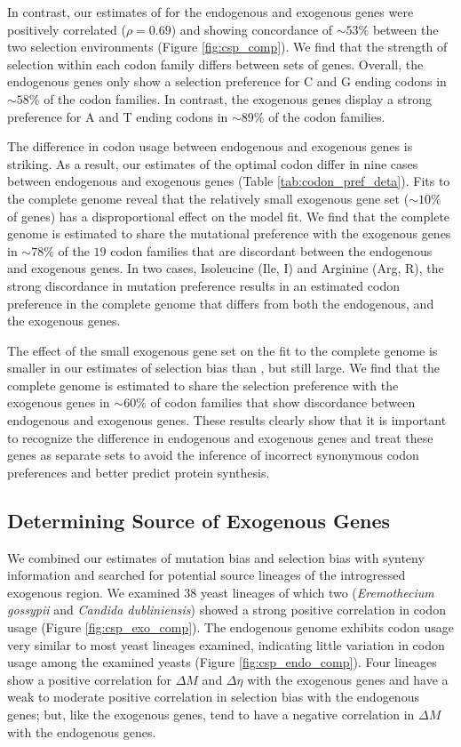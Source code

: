 In contrast, our estimates of \DE for the endogenous and exogenous genes were positively correlated ($\rho = 0.69$) and showing concordance of $\sim53\%$ between the two selection environments (Figure \ref{fig:csp_comp}).
We find that the strength of selection within each codon family differs between sets of genes.
Overall, the endogenous genes only show a selection preference for C and G ending codons in $\sim58\%$ of the codon families.
In contrast, the exogenous genes display a strong preference for A and T ending codons in $\sim89\%$ of the codon families.

The difference in codon usage between endogenous and exogenous genes is striking.
As a result, our estimates of the optimal codon differ in nine cases between endogenous and exogenous genes (Table \ref{tab:codon_pref_deta}).
Fits to the complete \kluyveri genome reveal that the relatively small exogenous gene set ($\sim 10\%$ of genes) has a disproportional effect on the model fit.
We find that the complete \kluyveri genome is estimated to share the mutational preference with the exogenous genes in $\sim78\%$ of the $19$ codon families that are discordant between the endogenous and exogenous genes.
In two cases, Isoleucine (Ile, I) and Arginine (Arg, R), the strong discordance in mutation preference results in an estimated codon preference in the complete \kluyveri genome that differs from both the endogenous, and the exogenous genes.

The effect of the small exogenous gene set on the fit to the complete \kluyveri genome is smaller in our estimates of selection bias \DE than \DM, but still large.
We find that the complete \kluyveri genome is estimated to share the selection preference with the exogenous genes in $\sim60\%$ of codon families that show discordance between endogenous and exogenous genes.
These results clearly show that it is important to recognize the difference in endogenous and exogenous genes and treat these genes as separate sets to avoid the inference of incorrect synonymous codon preferences and better predict protein synthesis.

\subsection{Determining Source of Exogenous Genes}

We combined our estimates of mutation bias \DM and selection bias \DE with synteny information and searched for potential source lineages of the introgressed exogenous region.
We examined 38 yeast lineages of which two (\emph{Eremothecium gossypii} and \emph{Candida dubliniensis}) showed a strong positive correlation in codon usage (Figure \ref{fig:csp_exo_comp}).
The endogenous \kluyveri genome exhibits codon usage very similar to most yeast lineages examined, indicating little variation in codon usage among the examined yeasts (Figure \ref{fig:csp_endo_comp}).
Four lineages show a positive correlation for $\Delta M$ and $\Delta \eta$ with the exogenous genes and have a weak to moderate positive correlation in selection bias with the endogenous genes; but, like the exogenous genes, tend to have a negative correlation in $\Delta M$ with the endogenous genes.

